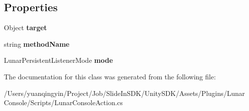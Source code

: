 \subsection*{Properties}
\begin{DoxyCompactItemize}
\item 
\mbox{\label{class_lunar_console_plugin_internal_1_1_lunar_console_action_call_a411840a995fc75792ef1c89fda4d6602}} 
Object {\bfseries target}
\item 
\mbox{\label{class_lunar_console_plugin_internal_1_1_lunar_console_action_call_aa2ba0e5e1d692f6030d1c887023cb47d}} 
string {\bfseries method\+Name}
\item 
\mbox{\label{class_lunar_console_plugin_internal_1_1_lunar_console_action_call_a0adf18b428916f64de5e704c2bc72fda}} 
Lunar\+Persistent\+Listener\+Mode {\bfseries mode}
\end{DoxyCompactItemize}


The documentation for this class was generated from the following file\+:\begin{DoxyCompactItemize}
\item 
/\+Users/yuanqingyin/\+Project/\+Job/\+Slide\+In\+S\+D\+K/\+Unity\+S\+D\+K/\+Assets/\+Plugins/\+Lunar\+Console/\+Scripts/Lunar\+Console\+Action.\+cs\end{DoxyCompactItemize}
